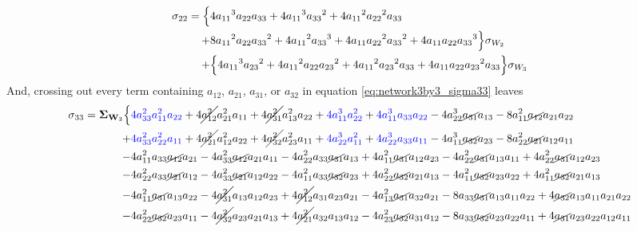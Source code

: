 \documentclass{article}
\begin{document}
\begin{align*}
\sigma_{22}= \Bigl\{ & 4{a_{11}}^3a_{22}a_{33}+4{a_{11}}^3{a_{33}}^2+4{a_{11}}^2{a_{22}}^2a_{33} \\
+&8{a_{11}}^2a_{22}{a_{33}}^2+4{a_{11}}^2{a_{33}}^3+4a_{11}{a_{22}}^2{a_{33}}^2+4a_{11}a_{22}{a_{33}}^3 \Bigr\}\sigma_{W_{2}} \\
+&\Bigl\{4{a_{11}}^3{a_{23}}^2+4{a_{11}}^2a_{22}{a_{23}}^2+4{a_{11}}^2{a_{23}}^2a_{33}+4a_{11}a_{22}{a_{23}}^2a_{33} \Bigr\} \sigma_{W_{3}}
\end{align*}
And, crossing out every term containing $a_{12}$, $a_{21}$, $a_{31}$, or $a_{32}$ in equation \ref{eq:network3by3_sigma33} leaves
\begin{equation}
\begin{aligned}
 \sigma_{33} =  \mathbf{\Sigma}_{\textbf{W}_{3}} \Bigl\{ & \textcolor{blue}{4 a_{33}^{2} a_{11}^{2} a_{22}} + 4 \cancel{a_{12}^{2}} a_{21}^{2} a_{11} + 4 \cancel{a_{31}^{2}} a_{13}^{2} a_{22} + \textcolor{blue}{4 a_{11}^{3} a_{22}^{2}} + \textcolor{blue}{4 a_{11}^{3} a_{33} a_{22}} - 4 a_{22}^{3} \cancel{a_{31}} a_{13} - 8 a_{11}^{2} \cancel{a_{12}} a_{21} a_{22} \\
+& \textcolor{blue}{4 a_{33}^{2} a_{22}^{2} a_{11}} + 4 \cancel{a_{21}^{2}} a_{12}^{2} a_{22} + 4 \cancel{a_{32}^{2}} a_{23}^{2} a_{11} + \textcolor{blue}{4 a_{22}^{3} a_{11}^{2}} + \textcolor{blue}{4 a_{22}^{3} a_{33} a_{11}} - 4 a_{11}^{3} \cancel{a_{32}} a_{23} - 8 a_{22}^{2} \cancel{a_{21}} a_{12} a_{11} \\
-& 4 a_{11}^{2} a_{33} \cancel{a_{12}} a_{21} - 4 a_{33}^{2} \cancel{a_{12}} a_{21} a_{11} - 4 a_{22}^{2} a_{33} \cancel{a_{31}} a_{13} + 4 a_{11}^{2} \cancel{a_{31}} a_{12} a_{23} - 4 a_{22}^{2} \cancel{a_{31}} a_{13} a_{11} + 4 a_{22}^{2} \cancel{a_{31}} a_{12} a_{23} \\
-& 4 a_{22}^{2} a_{33} \cancel{a_{21}} a_{12} - 4 a_{33}^{2} \cancel{a_{21}} a_{12} a_{22} - 4 a_{11}^{2} a_{33} \cancel{a_{32}} a_{23} + 4 a_{22}^{2} \cancel{a_{32}} a_{21} a_{13} - 4 a_{11}^{2} \cancel{a_{32}} a_{23} a_{22} + 4 a_{11}^{2} \cancel{a_{32}} a_{21} a_{13} \\
-& 4 a_{11}^{2} \cancel{a_{31}} a_{13} a_{22} - 4 \cancel{a_{31}^{2}} a_{13} a_{12} a_{23} + 4 \cancel{a_{12}^{2}} a_{31} a_{23} a_{21} - 4 a_{13}^{2} \cancel{a_{31}} a_{32} a_{21} - 8 a_{33} \cancel{a_{31}} a_{13} a_{11} a_{22} + 4 \cancel{a_{32}} a_{13} a_{11} a_{21} a_{22} \\
-& 4 a_{22}^{2} \cancel{a_{32}} a_{23} a_{11} - 4 \cancel{a_{32}^{2}} a_{23} a_{21} a_{13} + 4 \cancel{a_{21}^{2}} a_{32} a_{13} a_{12} - 4 a_{23}^{2} \cancel{a_{32}} a_{31} a_{12} - 8 a_{33} \cancel{a_{32}} a_{23} a_{22} a_{11} + 4 \cancel{a_{31}} a_{23} a_{22} a_{12} a_{11} \\

\end{aligned}
\end{equation}
\end{document}
